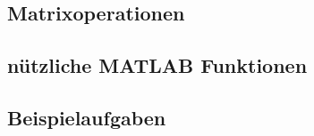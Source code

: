         \subsection{Matrixoperationen}
        \subsection{nützliche MATLAB Funktionen}
        \subsection{Beispielaufgaben}